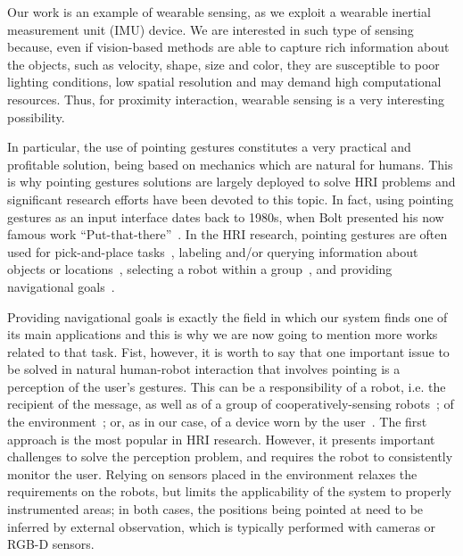 Our work is an example of wearable sensing, as we exploit a wearable inertial measurement unit (IMU) device. We are interested in such type of sensing because, even if vision-based methods are able to capture rich information about the objects, such as velocity, shape, size and color, they are susceptible to poor lighting conditions, low spatial resolution and may demand high computational resources.
Thus, for proximity interaction, wearable sensing is a very interesting possibility.

In particular, the use of pointing gestures constitutes a very practical and profitable solution, being based on mechanics which are natural for humans. This is why pointing gestures solutions are largely deployed to solve HRI problems and significant research efforts have been devoted to this topic.
In fact, using pointing gestures as an input interface dates back to 1980s, when Bolt presented his now famous work ``Put-that-there''~\cite{Bolt1980}.
In the HRI research, pointing gestures are often used for pick-and-place tasks~\cite{Brooks2006,Droeschel2011,Grossmann2014,Cosgun2015}, labeling and/or querying information about objects or locations~\cite{Brooks2006,Pateraki2014,Akkil2016}, selecting a robot within a group~\cite{Nagi2014a,Pourmehr2013}, and providing navigational goals~\cite{VanDenBergh2011,Abidi2013,Wolf2013,Jevtic2015,Gromov2016,Tolgyessy2017}.

Providing navigational goals is exactly the field in which our system finds one of its main applications and this is why we are now going to mention more works related to that task. Fist, however, it is worth to say that one important issue to be solved in natural human-robot interaction that involves pointing is a perception of the user's gestures. This can be a responsibility of a robot, i.e. the recipient of the message, as well as of a group of cooperatively-sensing robots~\cite{Giusti2012,Pourmehr2013}; of the environment~\cite{zivkovic2008toward}; or, as in our case, of a device worn by the user~\cite{Sugiyama2013,Wolf2013,Gromov2016}. The first approach is the most popular in HRI research. However, it presents important challenges to solve the perception problem, and requires the robot to consistently monitor the user. Relying on sensors placed in the environment relaxes the requirements on the robots, but limits the applicability of the system to properly instrumented areas; in both cases, the positions being pointed at need to be inferred by external observation, which is typically performed with cameras or RGB-D sensors.

